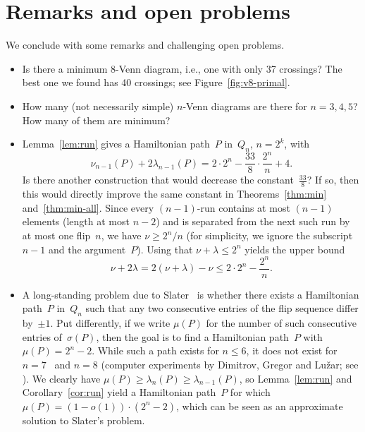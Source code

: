 \documentclass[11pt]{article}
\begin{document}
\section{Remarks and open problems}
\label{sec:open}
%
We conclude with some remarks and challenging open problems.
%
\begin{itemize}[leftmargin=4mm]
\item
Is there a minimum 8-Venn diagram, i.e., one with only 37 crossings?
The best one we found has 40 crossings; see Figure~\ref{fig:v8-primal}.
%
\item
How many (not necessarily simple) $n$-Venn diagrams are there for $n=3,4,5$?
How many of them are minimum?
%
\item
Lemma~\ref{lem:run} gives a Hamiltonian path~$P$ in~$Q_n$, $n=2^k$, with
\[ \nu_{n-1}(P)+2\lambda_{n-1}(P)=2\cdot 2^n-\frac{33}{8}\cdot\frac{2^n}{n}+4. \]
Is there another construction that would decrease the constant~$\frac{33}{8}$?
If so, then this would directly improve the same constant in Theorems~\ref{thm:min} and~\ref{thm:min-all}.
%
Since every $(n-1)$-run contains at most $(n-1)$ elements (length at most $n-2$) and is separated from the next such run by at most one flip~$n$, we have $\nu\geq 2^n/n$ (for simplicity, we ignore the subscript~$n-1$ and the argument~$P$).
Using that $\nu+\lambda\le 2^n$ yields the upper bound
\[ \nu+2\lambda=2(\nu+\lambda)-\nu \le 2\cdot 2^n-\frac{2^n}{n}. \]
%
\item
A long-standing problem due to Slater~\cite{slater_1979} is whether there exists a Hamiltonian path~$P$ in~$Q_n$ such that any two consecutive entries of the flip sequence differ by~$\pm 1$.
Put differently, if we write $\mu(P)$ for the number of such consecutive entries of~$\sigma(P)$, then the goal is to find a Hamiltonian path~$P$ with $\mu(P)=2^n-2$.
While such a path exists for $n\le 6$, it does not exist for $n=7$~\cite{slater_1989} and $n=8$ (computer experiments by Dimitrov, Gregor and Lu\v{z}ar; see \cite[Problem~10]{MR4649606}).
We clearly have $\mu(P)\geq\lambda_n(P)\geq \lambda_{n-1}(P)$, so Lemma~\ref{lem:run} and Corollary~\ref{cor:run} yield a Hamiltonian path~$P$ for which $\mu(P)=(1-o(1))\cdot (2^n-2)$, which can be seen as an approximate solution to Slater's problem.
\end{itemize}
%
%



\end{document}
